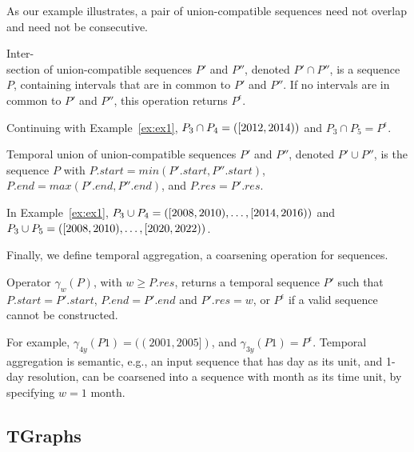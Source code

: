 As our example illustrates, a pair of union-compatible sequences need
not overlap and need not be consecutive.

\begin{definition}  
Inter-\\section of union-compatible sequences $P'$ and $P''$, denoted $P'
\cap P''$, is a sequence $P$, containing intervals that are in common
to $P'$ and $P''$.  If no intervals are in common to $P'$ and $P''$,
this operation returns $P^{\epsilon}$.
\label{def:tseqand}
\end{definition}
\vspace{-0.1cm}

Continuing with Example~\ref{ex:ex1}, $P_3 \cap P_4 =
([2012,2014))$ and $P_3 \cap P_5 = P^{\epsilon}$.

\begin{definition} 
Temporal union of union-compatible sequences $P'$ and $P''$, denoted
$P' \cup P''$, is the sequence $P$ with $P.start = min(P'.start,
P''.start)$, $P.end = max(P'.end, P''.end)$, and $P.res = P'.res$.
\label{def:tseqor}
\end{definition}
\vspace{-0.1cm}

In Example~\ref{ex:ex1}, $P_3 \cup P_4 =
([2008,2010),\ldots,[2014,2016))$ and $P_3
    \cup P_5 = ([2008,2010), \ldots,
      [2020,2022))$.

Finally, we define temporal aggregation, a coarsening operation for sequences.

\begin{definition}  Operator $\gamma_w(P)$, 
with $w \geq P.res$, returns a temporal sequence $P'$ such that
$P.start = P'.start$, $P.end = P'.end$ and $P'.res = w$, or
$P^{\epsilon}$ if a valid sequence cannot be constructed.
\label{def:tgroup}
\end{definition}

For example, $\gamma_{4y}(P1) = ((2001,2005])$, and
      $\gamma_{3y}(P1)=P^\epsilon$.  Temporal aggregation is semantic,
      e.g., an input sequence that has day as its unit, and 1-day
      resolution, can be coarsened into a sequence with month as its
      time unit, by specifying $w = 1$ month.

\subsection{TGraphs}
\label{sec:model:tg}

